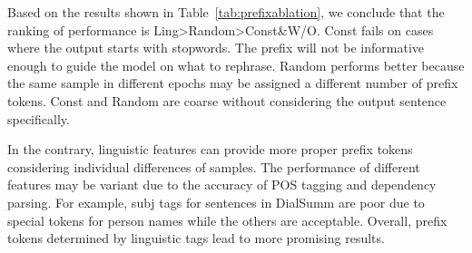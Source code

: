 Based on the results shown in Table~\ref{tab:prefixablation}, we conclude that the ranking of performance is Ling>Random>Const\&W/O.
Const fails on cases where the output starts with stopwords. The prefix will not be informative enough to guide the model on what to rephrase. Random performs better because the same sample in different epochs may be assigned a different number of prefix tokens. %
Const and Random are coarse without considering the output sentence specifically.

In the contrary, linguistic features can provide more proper prefix tokens considering individual differences of samples. The performance of different features may be variant due to the accuracy of POS tagging and dependency parsing. For example, subj tags for sentences in DialSumm are poor due to special tokens for person names while the others are acceptable. 
Overall, prefix tokens determined by linguistic tags lead to more promising results.

